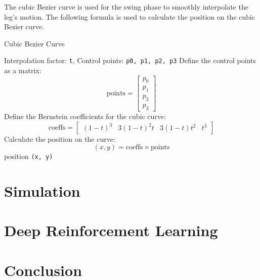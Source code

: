 \documentclass[a4paper,11pt]{article}
\begin{document}
The cubic Bezier curve is used for the swing phase to smoothly interpolate the leg's motion. The following formula is used to calculate the position on the cubic Bezier curve.

\begin{algorithm}[H]
	\caption{Cubic Bezier Curve}
	\begin{algorithmic}[1]
		\Require Interpolation factor: \texttt{t}, Control points: \texttt{p0, p1, p2, p3}
		\State Define the control points as a matrix:
		$$
			\text{points} = \begin{bmatrix} p_0 \\ p_1 \\ p_2 \\ p_3 \end{bmatrix}
		$$
		\State Define the Bernstein coefficients for the cubic curve:
		$$
			\text{coeffs} = \begin{bmatrix} (1-t)^3 & 3(1-t)^2t & 3(1-t)t^2 & t^3 \end{bmatrix}
		$$
		\State Calculate the position on the curve:
		$$
			(x, y) = \text{coeffs} \times \text{points}
		$$
		\State \Return position \texttt{(x, y)}
	\end{algorithmic}
\end{algorithm}

\section*{Simulation}

\section*{Deep Reinforcement Learning}

\section*{Conclusion}
\end{document}
